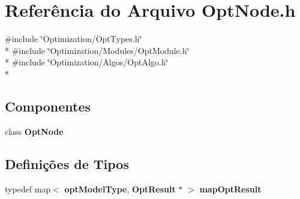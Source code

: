 \section{Referência do Arquivo Opt\+Node.\+h}
\label{_opt_node_8h}
{\ttfamily \#include \char`\"{}Optimization/\+Opt\+Types.\+h\char`\"{}}\\*
{\ttfamily \#include \char`\"{}Optimization/\+Modules/\+Opt\+Module.\+h\char`\"{}}\\*
{\ttfamily \#include \char`\"{}Optimization/\+Algos/\+Opt\+Algo.\+h\char`\"{}}\\*
\subsection*{Componentes}
\begin{DoxyCompactItemize}
\item 
class {\bf Opt\+Node}
\end{DoxyCompactItemize}
\subsection*{Definições de Tipos}
\begin{DoxyCompactItemize}
\item 
typedef map$<$ {\bf opt\+Model\+Type}, {\bf Opt\+Result} $\ast$ $>$ {\bf map\+Opt\+Result}
\end{DoxyCompactItemize}
